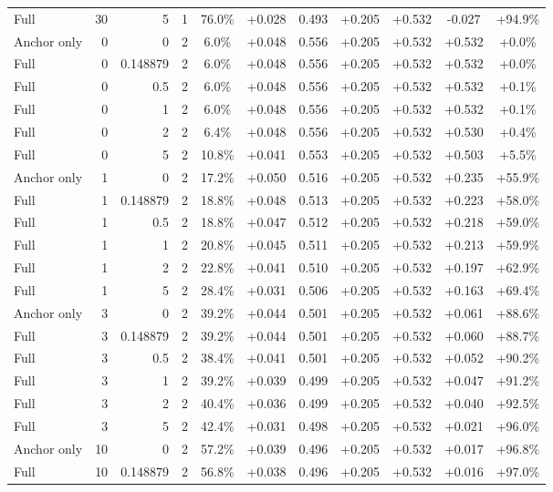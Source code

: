 \begin{table}[htbp]
\begin{tabular}{lrrrccccccc}
Full & 30 & 5 & 1 & 76.0\% & +0.028 & 0.493 & +0.205 & +0.532 & -0.027 & +94.9\% \\
Anchor only & 0 & 0 & 2 & 6.0\% & +0.048 & 0.556 & +0.205 & +0.532 & +0.532 & +0.0\% \\
Full & 0 & 0.148879 & 2 & 6.0\% & +0.048 & 0.556 & +0.205 & +0.532 & +0.532 & +0.0\% \\
Full & 0 & 0.5 & 2 & 6.0\% & +0.048 & 0.556 & +0.205 & +0.532 & +0.532 & +0.1\% \\
Full & 0 & 1 & 2 & 6.0\% & +0.048 & 0.556 & +0.205 & +0.532 & +0.532 & +0.1\% \\
Full & 0 & 2 & 2 & 6.4\% & +0.048 & 0.556 & +0.205 & +0.532 & +0.530 & +0.4\% \\
Full & 0 & 5 & 2 & 10.8\% & +0.041 & 0.553 & +0.205 & +0.532 & +0.503 & +5.5\% \\
Anchor only & 1 & 0 & 2 & 17.2\% & +0.050 & 0.516 & +0.205 & +0.532 & +0.235 & +55.9\% \\
Full & 1 & 0.148879 & 2 & 18.8\% & +0.048 & 0.513 & +0.205 & +0.532 & +0.223 & +58.0\% \\
Full & 1 & 0.5 & 2 & 18.8\% & +0.047 & 0.512 & +0.205 & +0.532 & +0.218 & +59.0\% \\
Full & 1 & 1 & 2 & 20.8\% & +0.045 & 0.511 & +0.205 & +0.532 & +0.213 & +59.9\% \\
Full & 1 & 2 & 2 & 22.8\% & +0.041 & 0.510 & +0.205 & +0.532 & +0.197 & +62.9\% \\
Full & 1 & 5 & 2 & 28.4\% & +0.031 & 0.506 & +0.205 & +0.532 & +0.163 & +69.4\% \\
Anchor only & 3 & 0 & 2 & 39.2\% & +0.044 & 0.501 & +0.205 & +0.532 & +0.061 & +88.6\% \\
Full & 3 & 0.148879 & 2 & 39.2\% & +0.044 & 0.501 & +0.205 & +0.532 & +0.060 & +88.7\% \\
Full & 3 & 0.5 & 2 & 38.4\% & +0.041 & 0.501 & +0.205 & +0.532 & +0.052 & +90.2\% \\
Full & 3 & 1 & 2 & 39.2\% & +0.039 & 0.499 & +0.205 & +0.532 & +0.047 & +91.2\% \\
Full & 3 & 2 & 2 & 40.4\% & +0.036 & 0.499 & +0.205 & +0.532 & +0.040 & +92.5\% \\
Full & 3 & 5 & 2 & 42.4\% & +0.031 & 0.498 & +0.205 & +0.532 & +0.021 & +96.0\% \\
Anchor only & 10 & 0 & 2 & 57.2\% & +0.039 & 0.496 & +0.205 & +0.532 & +0.017 & +96.8\% \\
Full & 10 & 0.148879 & 2 & 56.8\% & +0.038 & 0.496 & +0.205 & +0.532 & +0.016 & +97.0\% \\

\end{tabular}
\end{table}

